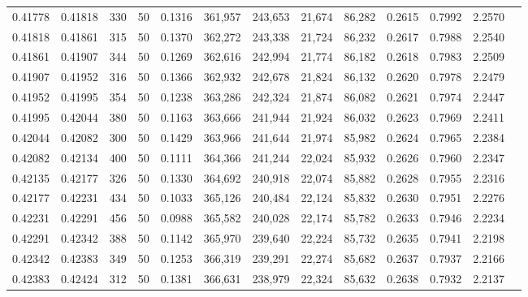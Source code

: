 \begin{tabular}{rrrrrrrrrrrrr}
0.41778 & 0.41818 &   330 &  50 &                                     0.1316 & 361,957 & 243,653 &  21,674 &  86,282 & 0.2615 & 0.7992 & 2.2570 \\
0.41818 & 0.41861 &   315 &  50 &                                     0.1370 & 362,272 & 243,338 &  21,724 &  86,232 & 0.2617 & 0.7988 & 2.2540 \\
0.41861 & 0.41907 &   344 &  50 &                                     0.1269 & 362,616 & 242,994 &  21,774 &  86,182 & 0.2618 & 0.7983 & 2.2509 \\
0.41907 & 0.41952 &   316 &  50 &                                     0.1366 & 362,932 & 242,678 &  21,824 &  86,132 & 0.2620 & 0.7978 & 2.2479 \\
0.41952 & 0.41995 &   354 &  50 &                                     0.1238 & 363,286 & 242,324 &  21,874 &  86,082 & 0.2621 & 0.7974 & 2.2447 \\
0.41995 & 0.42044 &   380 &  50 &                                     0.1163 & 363,666 & 241,944 &  21,924 &  86,032 & 0.2623 & 0.7969 & 2.2411 \\
0.42044 & 0.42082 &   300 &  50 &                                     0.1429 & 363,966 & 241,644 &  21,974 &  85,982 & 0.2624 & 0.7965 & 2.2384 \\
0.42082 & 0.42134 &   400 &  50 &                                     0.1111 & 364,366 & 241,244 &  22,024 &  85,932 & 0.2626 & 0.7960 & 2.2347 \\
0.42135 & 0.42177 &   326 &  50 &                                     0.1330 & 364,692 & 240,918 &  22,074 &  85,882 & 0.2628 & 0.7955 & 2.2316 \\
0.42177 & 0.42231 &   434 &  50 &                                     0.1033 & 365,126 & 240,484 &  22,124 &  85,832 & 0.2630 & 0.7951 & 2.2276 \\
0.42231 & 0.42291 &   456 &  50 &                                     0.0988 & 365,582 & 240,028 &  22,174 &  85,782 & 0.2633 & 0.7946 & 2.2234 \\
0.42291 & 0.42342 &   388 &  50 &                                     0.1142 & 365,970 & 239,640 &  22,224 &  85,732 & 0.2635 & 0.7941 & 2.2198 \\
0.42342 & 0.42383 &   349 &  50 &                                     0.1253 & 366,319 & 239,291 &  22,274 &  85,682 & 0.2637 & 0.7937 & 2.2166 \\
0.42383 & 0.42424 &   312 &  50 &                                     0.1381 & 366,631 & 238,979 &  22,324 &  85,632 & 0.2638 & 0.7932 & 2.2137 \\

\end{tabular}
